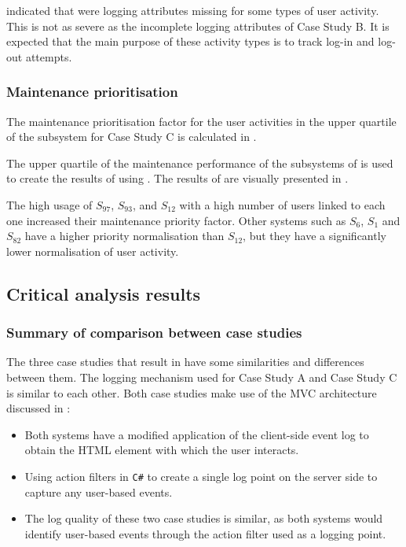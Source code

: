  indicated that were logging attributes missing for some types of user activity. This is not as severe as the incomplete logging attributes of Case Study B. It is expected that the main purpose of these activity types is to track log-in and log-out attempts.

\subsubsection{Maintenance prioritisation}
The maintenance prioritisation factor for the user activities in the upper quartile of the subsystem for Case Study C is calculated in .



The upper quartile of the maintenance performance of the subsystems of  is used to create the results of  using . The results of  are visually presented in .\par The high usage of $S_{97}$, $S_{93}$, and $S_{12}$ with a high number of users linked to each one increased their maintenance priority factor. Other systems such as $S_{6}$, $S_{1}$ and $S_{82}$ have a higher priority normalisation than $S_{12}$, but they have a significantly lower normalisation of user activity.

\subsection{Critical analysis results}\label{sec:ch3_criticalAnalysis}

\subsubsection{Summary of comparison between case studies}
The three case studies that result in  have some similarities and differences between them. The logging mechanism used for Case Study A and Case Study C is similar to each other. Both case studies make use of the MVC architecture discussed in :

\begin{itemize}
	\item Both systems have a modified application of the  client-side event log to obtain the HTML element with which the user interacts.
	\item Using action filters in \texttt{C\#} to create a single log point on the server side to capture any user-based events. 
	\item The log quality of these two case studies is similar, as both systems would identify user-based events through the action filter used as a logging point.
\end{itemize}

